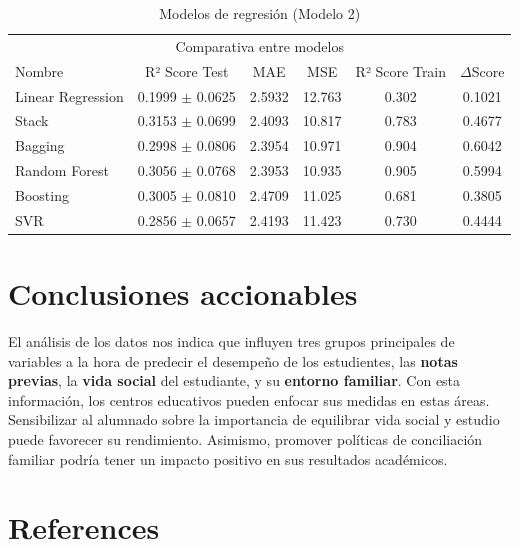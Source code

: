 \documentclass{article}
\begin{document}
\begin{table}[H]
  \caption{Modelos de regresión (Modelo 2)}
  \label{table-M2}
  \centering
  \begin{tabular}{lccccc}
    \toprule
    \multicolumn{6}{c}{Comparativa entre modelos} \\
    \cmidrule(r){1-6}
    Nombre & R² Score Test & MAE & MSE & R² Score Train & $\Delta$Score \\
    \midrule
    Linear Regression  & 0.1999 $\pm$ 0.0625 & 2.5932 & 12.763 & 0.302 & 0.1021\\
    Stack              & 0.3153 $\pm$ 0.0699 & 2.4093 & 10.817 & 0.783 & 0.4677 \\
    Bagging            & 0.2998 $\pm$ 0.0806 & 2.3954 & 10.971 & 0.904 & 0.6042\\
    Random Forest      & 0.3056 $\pm$ 0.0768 & 2.3953 & 10.935 & 0.905 & 0.5994\\
    Boosting           & 0.3005 $\pm$ 0.0810 & 2.4709 & 11.025 & 0.681 & 0.3805\\
    SVR                & 0.2856 $\pm$ 0.0657 & 2.4193 & 11.423 & 0.730 & 0.4444\\
    \bottomrule
  \end{tabular}
\end{table}

\section{Conclusiones accionables}

El análisis de los datos nos indica que influyen tres grupos principales de variables a la hora de predecir el desempeño de los estudientes, las \textbf{notas previas}, la \textbf{vida social} del estudiante, y su \textbf{entorno familiar}.
Con esta información, los centros educativos pueden enfocar sus medidas en estas áreas. Sensibilizar al alumnado sobre la importancia de equilibrar vida social y estudio puede favorecer su rendimiento. Asimismo, promover políticas de 
conciliación familiar podría tener un impacto positivo en sus resultados académicos.


\section*{References}
\end{document}
